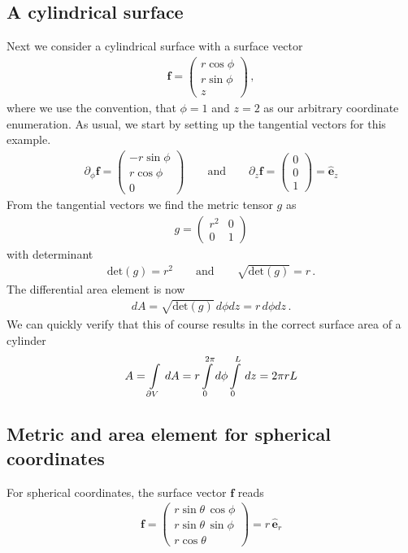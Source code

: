 \documentclass[11pt, DINA4, fleqn]{amsart}
\def\ve{\boldsymbol{e}\xspace}
\def\vf{\boldsymbol{f}\xspace}
\begin{document}
\subsection{A cylindrical surface}
Next we consider a cylindrical surface with a surface vector
\begin{align}
\vf = \begin{pmatrix}
r \cos\phi \\
r \sin\phi \\
z
\end{pmatrix} \, ,
\end{align}
where we use the convention, that $\phi = 1$ and $z = 2$ as our arbitrary coordinate enumeration.
As usual, we start by setting up the tangential vectors for this example.
\begin{align}
\partial_{\phi} \vf = \begin{pmatrix}
-r \sin\phi \\
r \cos\phi \\
0
\end{pmatrix} \qquad \text{and} \qquad
\partial_z\vf = \begin{pmatrix}
0 \\ 0 \\ 1
\end{pmatrix} = \hat{\ve}_z
\end{align}
From the tangential vectors we find the metric tensor $g$ as
\begin{align}
g = \begin{pmatrix}
r^2 & 0 \\
0 & 1
\end{pmatrix}
\end{align}
with determinant
\begin{align}
\text{det}(g) = r^2 \qquad \text{and} \qquad \sqrt{\text{det}(g)} = r \, .
\end{align}
The differential area element is now
\begin{align}
dA = \sqrt{\text{det}(g)} \, d\phi dz = r \, d\phi dz \, .
\end{align}
We can quickly verify that this of course results in the correct surface area of a cylinder
\begin{align}
A = \int \displaylimits_{\partial V}\, dA = r \int \displaylimits_{0}^{2\pi}d\phi \int \displaylimits_{0}^{L} \, dz
= 2\pi r L
\end{align}

\subsection{Metric and area element for spherical coordinates}
For spherical coordinates, the surface vector $\boldsymbol{f}$ reads
\begin{align}
	\boldsymbol{f} = \begin{pmatrix}
		r \sin\theta \, \cos\phi \\
		r \sin\theta \, \sin\phi \\
		r \cos\theta
	\end{pmatrix} = r \, \hat{\boldsymbol{e}}_r
\end{align}
\end{document}
